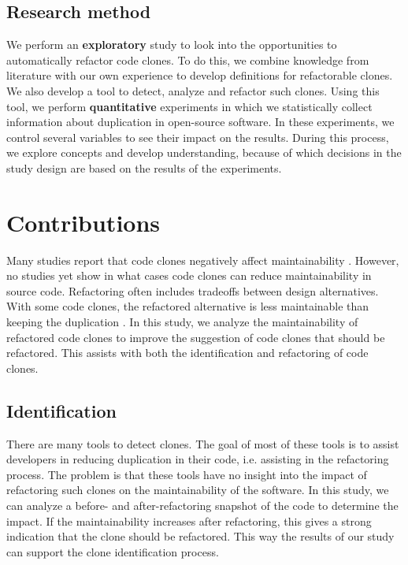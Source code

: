 \subsection{Research method}
We perform an \textbf{exploratory} study to look into the opportunities to automatically refactor code clones. To do this, we combine knowledge from literature with our own experience to develop definitions for refactorable clones. We also develop a tool to detect, analyze and refactor such clones. Using this tool, we perform \textbf{quantitative} experiments in which we statistically collect information about duplication in open-source software. In these experiments, we control several variables to see their impact on the results. During this process, we explore concepts and develop understanding, because of which decisions in the study design are based on the results of the experiments.

\section{Contributions}
Many studies report that code clones negatively affect maintainability \cite{heitlager2007practical, monden2002software, juergens2009code, chatterji2013effects}. However, no studies yet show in what cases code clones can reduce maintainability in source code. Refactoring often includes tradeoffs between design alternatives. With some code clones, the refactored alternative is less maintainable than keeping the duplication \cite{kapser2006cloning, aversano2007clones, hotta2010duplicate, kim2005empirical, krinke2007study, saha2010evaluating}. In this study, we analyze the maintainability of refactored code clones to improve the suggestion of code clones that should be refactored. This assists with both the identification and refactoring of code clones.

\subsection{Identification}
There are many tools to detect clones. The goal of most of these tools is to assist developers in reducing duplication in their code, i.e. assisting in the refactoring process. The problem is that these tools have no insight into the impact of refactoring such clones on the maintainability of the software. In this study, we can analyze a before- and after-refactoring snapshot of the code to determine the impact. If the maintainability increases after refactoring, this gives a strong indication that the clone should be refactored. This way the results of our study can support the clone identification process.

